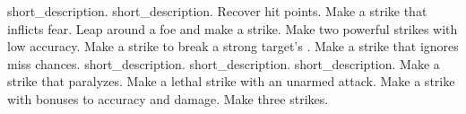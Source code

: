 \begin{spelllist}
 short_description.
 short_description.
 Recover hit points.
 Make a strike that inflicts fear.
 Leap around a foe and make a strike.
 Make two powerful strikes with low accuracy.
 Make a strike to break a strong target's .
 Make a strike that ignores miss chances.
 short_description.
 short_description.
 short_description.
 Make a strike that paralyzes.
 Make a lethal strike with an unarmed attack.
 Make a strike with bonuses to accuracy and damage.
 Make three strikes.
\end{spelllist}



\small
